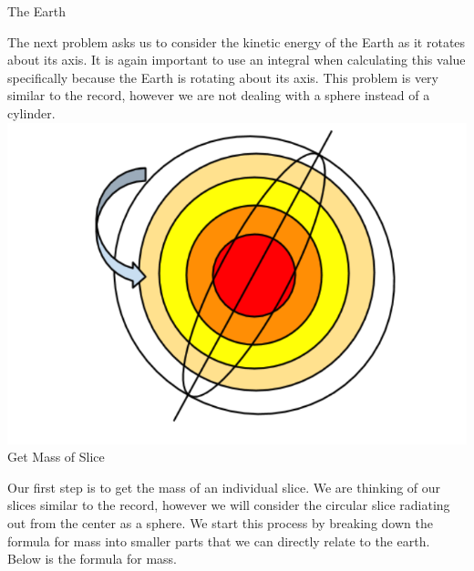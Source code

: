\documentclass[a4paper, 11pt, oneside]{book} %
\begin{document}
{\LARGE The Earth \\} %
\vspace{0.5\baselineskip} %
\vspace{0.5\baselineskip} %

The next problem asks us to consider the kinetic energy of the Earth as it rotates about its axis. It is again important to use an integral when calculating this value specifically because the Earth is rotating about its axis. This problem is very similar to the record, however we are not dealing with a sphere instead of a cylinder. \\

\includegraphics[scale=0.5]{earth2}\\

{\LARGE Get Mass of Slice \\} %
\vspace{0.5\baselineskip} %
\vspace{0.5\baselineskip} %

Our first step is to get the mass of an individual slice. We are thinking of our slices similar to the record, however we will consider the circular slice radiating out from the center as a sphere. We start this process by breaking down the formula for mass into smaller parts that we can directly relate to the earth. Below is the formula for mass. \\

\vspace{0.5\baselineskip} %
\vspace{0.5\baselineskip} %
\end{document}

